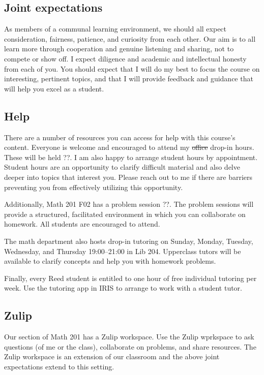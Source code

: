 \documentclass[11pt,twoside]{amsart}
\begin{document}
\subsection*{Joint expectations}
As members of a communal learning environment, we should all expect consideration, fairness, patience, and curiosity from each other.  Our aim is to all learn more through cooperation and genuine listening and sharing, not to compete or show off.  I expect diligence and academic and intellectual honesty from each of you.  You should expect that I will do my best to focus the course on interesting, pertinent topics, and that I will provide feedback and guidance that will help you excel as a student.

\subsection*{Help}
There are a number of resources you can access for help with this course's content.  Everyone is welcome and encouraged to attend my \sout{office} drop-in hours. These will be held ??.  I am also happy to arrange student hours by appointment.  Student hours are an opportunity to clarify difficult material and also delve deeper into topics that interest you.  Please reach out to me if there are barriers preventing you from effectively utilizing this opportunity.

Additionally, Math 201 F02 has a problem session ??.  The problem sessions will provide a structured, facilitated environment in which you can collaborate on homework.  All students are encouraged to attend.

The math department also hosts drop-in tutoring on Sunday, Monday, Tuesday, Wednesday, and Thursday 19:00--21:00 in Lib 204. Upperclass tutors will be available to clarify concepts and help you with homework problems.

Finally, every Reed student is entitled to one hour of free individual tutoring per week.  Use the tutoring app in IRIS to arrange to work with a student tutor.

\subsection*{Zulip}
Our section of Math 201 has a Zulip workspace.  Use the Zulip wprkspace to ask questions (of me or the class), collaborate on problems, and share resources. The Zulip workspace is an extension of our classroom and the above joint expectations extend to this setting.
\end{document}
